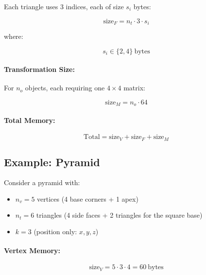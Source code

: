 \documentclass[11pt]{article}
\begin{document}
Each triangle uses 3 indices, each of size $s_i$ bytes:

\begin{equation}
    \text{size}_F = n_t \cdot 3 \cdot s_i
\end{equation}

where:

\begin{equation}
    s_i \in \{2, 4\}\ \text{bytes}
\end{equation}

\paragraph{Transformation Size:}

For $n_o$ objects, each requiring one $4\times 4$ matrix:

\begin{equation}
    \text{size}_M = n_o \cdot 64
\end{equation}


\paragraph{Total Memory:}

\begin{equation}
    \text{Total} =
    \text{size}_V +
    \text{size}_F +
    \text{size}_M
\end{equation}

\subsection{Example: Pyramid}

Consider a pyramid with:

\begin{itemize}
    \item $n_v = 5$ vertices (4 base corners + 1 apex)
    \item $n_t = 6$ triangles (4 side faces + 2 triangles for the square base)
    \item $k = 3$ (position only: $x, y, z$)
\end{itemize}

\paragraph{Vertex Memory:}

\begin{equation}
    \text{size}_V = 5 \cdot 3 \cdot 4 = 60\ \text{bytes}
\end{equation}
\end{document}
